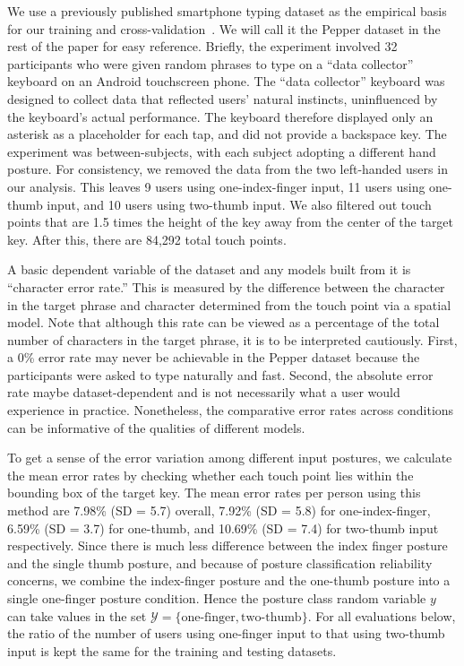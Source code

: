 \documentclass{sigchi}
\begin{document}
We use a previously published smartphone typing dataset as the
empirical basis for our training and cross-validation~\cite{Azenkot:2012}. We
will call it the Pepper dataset in the rest of the paper for easy reference.
Briefly, the experiment involved 32 participants who were given random phrases to type on a ``data collector'' keyboard on an Android touchscreen phone.  The ``data collector'' keyboard was 
designed to collect data that reflected users' natural instincts, uninfluenced 
by the keyboard's actual performance.  The keyboard therefore displayed only an 
asterisk as a placeholder for each tap, and did not provide a backspace key.  
The experiment was between-subjects, with each subject adopting a different hand
posture.  For consistency, we removed the data from the two left-handed users in
our analysis.  This leaves 9 users using one-index-finger input, 11 users using 
one-thumb input, and 10 users using two-thumb input.  We also filtered out touch 
points that are 1.5 times the height of the key away from the center of the 
target key. After this, there are 84,292 total touch points.
 
A basic dependent variable of the dataset and any models built from it
is ``character error rate.'' This is measured by the difference between the
character in the target phrase and character determined from the touch point via
a spatial model. Note that although this rate can be viewed as a percentage of the 
total number of characters in the target phrase, it is to be interpreted
cautiously.  First, a 0\% error rate may never be achievable in the Pepper 
dataset because the participants were asked to type naturally and fast. Second, 
the absolute error rate maybe dataset-dependent and is not necessarily what a user would experience in practice.  Nonetheless, the comparative error rates across conditions can be informative of the qualities 
of different models.

To get a sense of the error variation among different input postures, we
calculate the mean error rates by checking whether each touch point lies within the
bounding box of the target key. The mean error rates per person using this method are
7.98\% (SD = 5.7) overall, 7.92\% (SD = 5.8) for one-index-finger, 6.59\% (SD =
3.7) for one-thumb, and 10.69\% (SD = 7.4) for two-thumb input respectively.
Since there is much less difference between the index finger posture and the single thumb posture, and because of posture classification reliability concerns, we combine the index-finger posture and the one-thumb posture into a single one-finger posture condition. Hence the posture class random variable $y$ can take values in the set $\mathcal{Y} = \{\text{one-finger}, \text{two-thumb}\}$.
For all evaluations below, the ratio of the number of users using one-finger input to 
that using two-thumb input is kept the same for the training and testing datasets.
\end{document}
